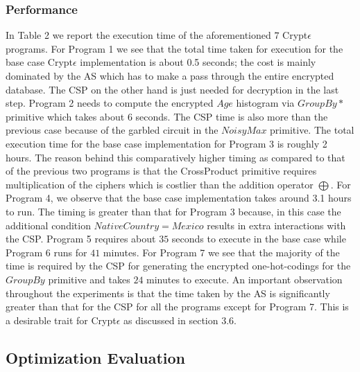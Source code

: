 \subsubsection{Performance}
In Table 2 we report the execution time of  the aforementioned $7$ Crypt$\epsilon$ programs. For Program 1 we see that the total time taken for execution for the base case Crypt$\epsilon$ implementation is about 0.5 seconds; the cost is mainly dominated by the \textsf{AS} which has to make a pass through the entire encrypted database. The \textsf{CSP} on the other hand is just needed for decryption in the last step. Program 2 needs to compute the encrypted $Age$ histogram via $GroupBy*$ primitive which takes about $6$ seconds. The \textsf{CSP} time is also more than the previous case because of the garbled circuit in the $NoisyMax$ primitive. The total execution time for the base case implementation for Program 3 is roughly 2 hours.  The reason behind this comparatively higher timing as compared to that of the previous two programs is that the \textsf{CrossProduct} primitive requires  multiplication of the ciphers  which is costlier than the addition operator $\bigoplus$. For Program 4, we observe that the base case implementation takes around 3.1 hours to run. The timing is greater than that for Program 3 because, in this case the additional condition $NativeCountry=Mexico$ results in extra interactions with the \textsf{CSP}. Program 5 requires about $35$ seconds to execute in the base case while Program 6 runs for $41$ minutes. For Program 7 we see that the majority of the time is required by the \textsf{CSP} for generating the encrypted one-hot-codings for the $GroupBy$ primitive and takes $24$ minutes to execute.  An important observation throughout the experiments is that the time taken by the \textsf{AS} is significantly greater than that for the \textsf{CSP} for all the programs except for Program 7. This is a desirable trait for Crypt$\epsilon$ as discussed in section 3.6.
\subsection{Optimization Evaluation}
